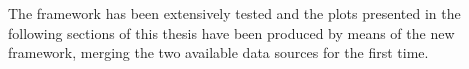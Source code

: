 
The framework has been extensively tested and the plots presented in the following sections of this thesis have been produced by means of the new framework, merging the two available data sources for the first time.

